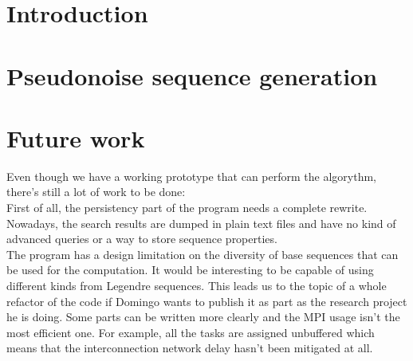 \documentclass{tfg_domingo}
\begin{document}

\portada
\frontmatter
\gracias{}
\resumen{}{}
\tableofcontents

\mainmatter


\chapter{Introduction}



\chapter{Pseudonoise sequence generation}











\chapter{Future work}

  Even though we have a working prototype that can perform the algorythm,
  there's still a lot of work to be done:\\

  First of all, the persistency part of the program needs a complete rewrite.
  Nowadays, the search results are dumped in plain text files and have no
  kind of advanced queries or a way to store sequence properties.\\

  The program has a design limitation on the diversity of base sequences
  that can be used for the computation. It would be interesting to be capable
  of using different kinds from Legendre sequences. This leads us to the topic
  of a whole refactor of the code if Domingo wants to publish it as part as
  the research project he is doing. Some parts can be written more clearly
  and the MPI usage isn't the most efficient one. For example, all the tasks
  are assigned unbuffered which means that the interconnection network delay
  hasn't been mitigated at all.\\
\end{document}
